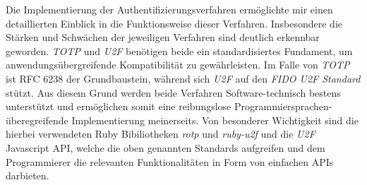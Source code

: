 \documentclass[11pt,a4paper,ngerman]{scrreprt}
\begin{document}
Die Implementierung der Authentifizierungsverfahren ermöglichte mir einen detaillierten Einblick in die Funktionsweise dieser Verfahren. Insbesondere die Stärken und Schwächen der jeweiligen Verfahren sind deutlich erkennbar geworden. \textit{TOTP} und \textit{U2F} benötigen beide ein standardisiertes Fundament, um anwendungsübergreifende Kompatibilität zu gewährleisten. Im Falle von \textit{TOTP} ist RFC 6238 der Grundbaustein, während sich \textit{U2F} auf den \textit{FIDO U2F Standard} stützt. Aus diesem Grund werden beide Verfahren Software-technisch bestens unterstützt und ermöglichen somit eine reibungslose Programmiersprachen-überegreifende Implementierung meinerseits. Von besonderer Wichtigkeit sind die hierbei verwendeten Ruby Bibiliotheken \textit{rotp} und \textit{ruby-u2f} und die \textit{U2F} Javascript API, welche die oben genannten Standards aufgreifen und dem Programmierer die relevanten Funktionalitäten in Form von einfachen APIs darbieten.
\end{document}
